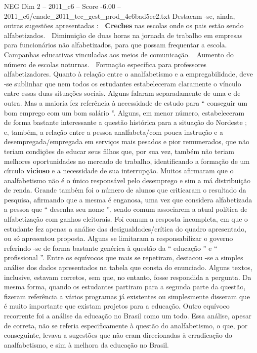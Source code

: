 \begin{textsample}{NEG Dim 2 – 2011\_c6 – Score -6.00 – 2011\_c6/enade\_2011\_tec\_gest\_prod\_4e6bad5ee2.txt}
Destacam -se, ainda, outras sugestões apresentadas :  \textbf{Creches} nas escolas onde os pais estão sendo alfabetizados.  Diminuição de duas horas na jornada de trabalho em empresas para funcionários não alfabetizados, para que possam frequentar a escola.  Campanhas educativas vinculadas aos meios de comunicação.  Aumento do número de escolas noturnas.  Formação específica para professores alfabetizadores.
Quanto à relação entre o analfabetismo e a empregabilidade, deve -se sublinhar que nem todos os estudantes estabeleceram claramente o vínculo entre essas duas situações sociais.
Alguns falaram separadamente de uma e de outra.
Mas a maioria fez referência à necessidade de estudo para “ conseguir um bom emprego com um bom salário ”.
Alguns, em menor número, estabeleceram de forma bastante interessante a questão histórica para a situação do Nordeste ; e, também, a relação entre a pessoa analfabeta/com pouca instrução e a desempregada/empregada em serviços mais pesados e pior remunerados, que não teriam condições de educar seus filhos que, por sua vez, também não teriam melhores oportunidades no mercado de trabalho, identificando a formação de um círculo \textbf{vicioso} e a necessidade de sua interrupção.
Muitos afirmaram que o analfabetismo não é o único responsável pelo desemprego e sim a má distribuição de renda.
Grande também foi o número de alunos que criticaram o resultado da pesquisa, afirmando que a mesma é enganosa, uma vez que considera alfabetizada a pessoa que “ desenha seu nome ”, sendo comum associarem a atual política de alfabetização com ganhos eleitorais.
Foi comum a resposta incompleta, em que o estudante fez apenas a análise das desigualdades/crítica do quadro apresentado, ou só apresentou proposta.
Alguns se limitaram a responsabilizar o governo referindo -se de forma bastante genérica à questão da “ educação ” e “ profissional ”.
Entre os equívocos que mais se repetiram, destacou -se a simples análise dos dados apresentados na tabela que consta do enunciado.
Alguns textos, inclusive, estavam corretos, sem que, no entanto, fosse respondida a pergunta.
Da mesma forma, quando os estudantes partiram para a segunda parte da questão, fizeram referência a vários programas já existentes ou simplesmente disseram que é muito importante que existam projetos para a educação.
Outro equívoco recorrente foi a análise da educação no Brasil como um todo.
Essa análise, apesar de correta, não se referia especificamente à questão do analfabetismo, o que, por conseguinte, levava a sugestões que não eram direcionadas à erradicação do analfabetismo, e sim à melhora da educação no Brasil.

\end{textsample}
